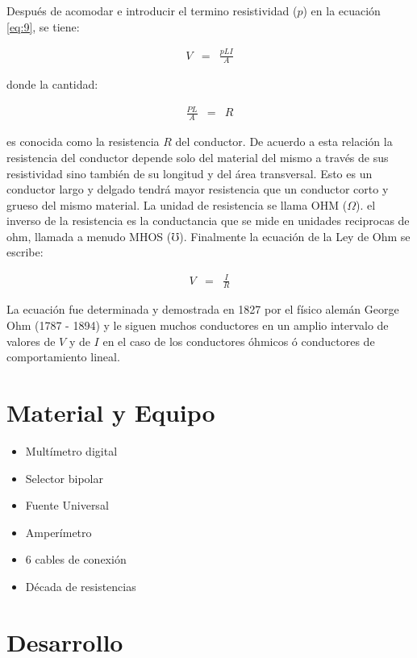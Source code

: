 \documentclass[11pt]{article}
\begin{document}
\begin{multicols}{2}
		Después de acomodar e introducir el termino resistividad ($p$) en la ecuación \ref{eq:9}, se tiene:
		
		\begin{eqnarray}
			V &=& \frac{pLI}{A} \label{eq:10}
		\end{eqnarray}

		donde la cantidad:

		\begin{eqnarray}
			\frac{PL}{A} &=& R \label{eq:11}
		\end{eqnarray}

		es conocida como la resistencia $R$ del conductor.
		De acuerdo a esta relación la resistencia del conductor depende solo del material del mismo a través de sus resistividad sino también de su longitud y del área transversal.
		Esto es un conductor largo y delgado tendrá mayor resistencia que un conductor corto y grueso del mismo material. La unidad de resistencia se llama OHM ($\Omega$).
		el inverso de la resistencia es la conductancia que se mide en unidades reciprocas de ohm, llamada a menudo MHOS ($\mho$). Finalmente la ecuación de la Ley de Ohm se escribe:
		
		\begin{eqnarray}
			V &=& \frac{I}{R} \label{eq:12}
		\end{eqnarray}

		La ecuación fue determinada y demostrada en 1827 por el físico alemán George Ohm (1787 - 1894) y le siguen muchos conductores en un amplio intervalo de valores de $V$ y de $I$ en el caso de los conductores óhmicos ó conductores de comportamiento lineal.

\section{Material y Equipo}

	\begin{itemize}
		\item Multímetro digital
		\item Selector bipolar
		\item Fuente Universal
		\item Amperímetro 
		\item 6 cables de conexión
		\item Década de resistencias 
	\end{itemize}

\section{Desarrollo}


\end{multicols}
\end{document}
